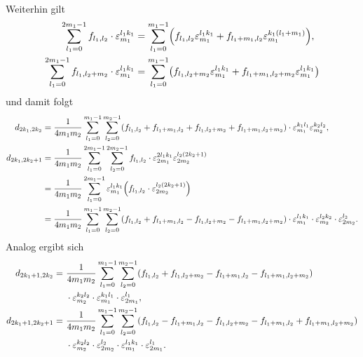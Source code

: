 \documentclass{exercise}
\begin{document}
\begin{enumerate}
\begin{align*}
        \end{align*}
        Weiterhin gilt
        \begin{align*}
            \sum_{l_1 = 0}^{2m_1 - 1}f_{l_1, l_2} \cdot \varepsilon_{m_1}^{l_1 k_1} &= \sum_{l_1 = 0}^{m_1 - 1}\parentheses*{f_{l_1, l_2}\varepsilon_{m_1}^{l_1 k_1} + f_{l_1 + m_1, l_2}\varepsilon_{m_1}^{k_1\parentheses*{l_1 + m_1}}},\\
            \sum_{l_1 = 0}^{2m_1 - 1}f_{l_1, l_2 + m_2} \cdot \varepsilon_{m_1}^{l_1 k_1} &= \sum_{l_1 = 0}^{m_1 - 1}\parentheses*{f_{l_1, l_2 + m_2}\varepsilon_{m_1}^{l_1 k_1} + f_{l_1 + m_1, l_2 + m_2}\varepsilon_{m_1}^{l_1 k_1}}
        \end{align*}
        und damit folgt
        \begin{align*}
            d_{2k_1, 2k_2} &= \frac{1}{4m_1 m_2}\sum_{l_1 = 0}^{m_1 - 1}\sum_{l_2 = 0}^{m_2 - 1}\parentheses*{f_{l_1, l_2} + f_{l_1 + m_1, l_2} + f_{l_1, l_2 + m_2} + f_{l_1 + m_1, l_2 + m_2}} \cdot \varepsilon_{m_1}^{k_1 l_1}\varepsilon_{m_2}^{k_2 l_2},\\
            d_{2k_1, 2k_2 + 1} &= \frac{1}{4m_1 m_2}\sum_{l_1 = 0}^{2m_1 - 1}\sum_{l_2 = 0}^{2m_2 - 1}f_{l_1, l_2} \cdot \varepsilon_{2m_1}^{2l_1 k_1}\varepsilon_{2m_2}^{l_2\parentheses*{2k_2 + 1}}\\
            &= \frac{1}{4m_1 m_2}\sum_{l_1 = 0}^{2m_1 - 1}\varepsilon_{m_1}^{l_1 k_1}\parentheses*{f_{l_1, l_2} \cdot \varepsilon_{2m_2}^{l_2\parentheses*{2k_2 + 1}}}\\
            &= \frac{1}{4m_1 m_2}\sum_{l_1 = 0}^{m_1 - 1}\sum_{l_2 = 0}^{m_2 - 1}\parentheses*{f_{l_1, l_2} + f_{l_1 + m_1, l_2} - f_{l_1, l_2 + m_2} - f_{l_1 + m_1, l_2 + m_2}} \cdot \varepsilon_{m_1}^{l_1 k_1} \cdot \varepsilon_{m_2}^{l_2 k_2} \cdot \varepsilon_{2m_2}^{l_2}.
        \end{align*}
        Analog ergibt sich
        \begin{align*}
            d_{2k_1 + 1, 2k_2} =\ &\frac{1}{4m_1 m_2}\sum_{l_1 = 0}^{m_1 - 1}\sum_{l_2 = 0}^{m_2 - 1}\parentheses*{f_{l_1, l_2} + f_{l_1, l_2 + m_2} - f_{l_1 + m_1, l_2} - f_{l_1 + m_1, l_2 + m_2}}\\
            &\cdot \varepsilon_{m_2}^{k_2 l_2} \cdot \varepsilon_{m_1}^{k_1 l_1} \cdot \varepsilon_{2m_1}^{l_1},\\
            d_{2k_1 + 1, 2k_2 + 1} =\ &\frac{1}{4m_1 m_2}\sum_{l_1 = 0}^{m_1 - 1}\sum_{l_2 = 0}^{m_2 - 1}\parentheses*{f_{l_1, l_2} - f_{l_1 + m_1, l_2} - f_{l_1, l_2 + m_2} - f_{l_1 + m_1, l_2} + f_{l_1 + m_1, l_2 + m_2}}\\
            &\cdot \varepsilon_{m_2}^{k_2 l_2} \cdot \varepsilon_{2m_2}^{l_2} \cdot \varepsilon_{m_1}^{l_1 k_1} \cdot \varepsilon_{2m_1}^{l_1}.
        \end{align*}
    \end{enumerate}
\end{document}
